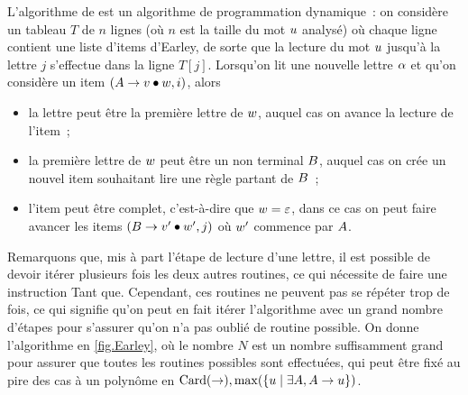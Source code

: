 L'algorithme de  est un algorithme de programmation
dynamique~: on considère un tableau $T$ de $n$ lignes (où $n$ est la taille
du mot $u$ analysé) où chaque ligne contient une liste d'items d'Earley,
de sorte que la lecture du mot $u$ jusqu'à la lettre $j$ s'effectue dans la
ligne $T[j]$. Lorsqu'on lit une nouvelle lettre $\alpha$ et qu'on considère un
item $(A\to v\bullet w,i)$, alors
\begin{itemize}
\item la lettre peut être la première lettre de $w$, auquel cas on avance
  la lecture de l'item~;
\item la première lettre de $w$ peut être un non terminal $B$, auquel
  cas on crée un nouvel item souhaitant lire une règle partant de $B$~;
\item l'item peut être complet, c'est-à-dire que $w = \varepsilon$, dans ce cas on
  peut faire avancer les items $(B\to v'\bullet w',j)$ où
  $w'$ commence par $A$.
\end{itemize}
Remarquons que, mis à part l'étape de lecture d'une lettre, il est possible de
devoir itérer plusieurs fois les deux autres routines, ce qui nécessite de faire
une instruction \og Tant que\fg. Cependant, ces routines ne peuvent pas se
répéter trop de fois, ce qui signifie qu'on peut en fait itérer l'algorithme
avec un grand nombre d'étapes pour s'assurer qu'on n'a pas oublié de routine
possible. On donne l'algorithme en \cref{fig.Earley}, où le nombre $N$ est un
nombre suffisamment grand pour assurer que toutes les routines possibles sont
effectuées, qui peut être fixé au pire des cas à un polynôme en
$\operatorname{Card}(\mathord{\to}), \max(\left\{ u \;\middle\vert\; \exists A, A\to u \right\})$.


